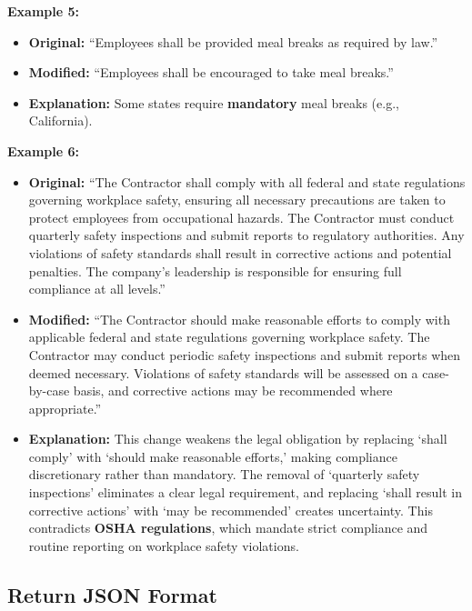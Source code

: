 \documentclass[11pt]{article}
\begin{document}
\begin{tcolorbox}[breakable,colback=lightestgray,colframe=black,title=\textbf{Ambiguity Legal Data Generation Prompt}]
\textbf{Example 5:}
\begin{itemize}
    \item \textbf{Original:} ``Employees shall be provided meal breaks as required by law.''
    \item \textbf{Modified:} ``Employees shall be encouraged to take meal breaks.''
    \item \textbf{Explanation:} Some states require \textbf{mandatory} meal breaks (e.g., California).
\end{itemize}

\textbf{Example 6:}
\begin{itemize}
    \item \textbf{Original:} ``The Contractor shall comply with all federal and state regulations governing workplace safety, ensuring all necessary precautions are taken to protect employees from occupational hazards. The Contractor must conduct quarterly safety inspections and submit reports to regulatory authorities. Any violations of safety standards shall result in corrective actions and potential penalties. The company's leadership is responsible for ensuring full compliance at all levels.''
    \item \textbf{Modified:} ``The Contractor should make reasonable efforts to comply with applicable federal and state regulations governing workplace safety. The Contractor may conduct periodic safety inspections and submit reports when deemed necessary. Violations of safety standards will be assessed on a case-by-case basis, and corrective actions may be recommended where appropriate.''
    \item \textbf{Explanation:} This change weakens the legal obligation by replacing `shall comply' with `should make reasonable efforts,' making compliance discretionary rather than mandatory. The removal of `quarterly safety inspections' eliminates a clear legal requirement, and replacing `shall result in corrective actions' with `may be recommended' creates uncertainty. This contradicts \textbf{OSHA regulations}, which mandate strict compliance and routine reporting on workplace safety violations.
\end{itemize}

\subsection*{\textbf{Return JSON Format}}


\end{tcolorbox}
\end{document}
